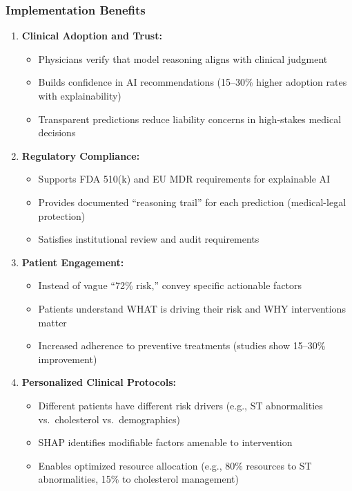 \documentclass[12pt,a4paper]{article}
\begin{document}
\subsubsection{Implementation Benefits}

\begin{enumerate}
    \item \textbf{Clinical Adoption and Trust:}
    \begin{itemize}
        \item Physicians verify that model reasoning aligns with clinical judgment
        \item Builds confidence in AI recommendations (15--30\% higher adoption rates with explainability)
        \item Transparent predictions reduce liability concerns in high-stakes medical decisions
    \end{itemize}
    
    \item \textbf{Regulatory Compliance:}
    \begin{itemize}
        \item Supports FDA 510(k) and EU MDR requirements for explainable AI
        \item Provides documented ``reasoning trail'' for each prediction (medical-legal protection)
        \item Satisfies institutional review and audit requirements
    \end{itemize}
    
    \item \textbf{Patient Engagement:}
    \begin{itemize}
        \item Instead of vague ``72\% risk,'' convey specific actionable factors
        \item Patients understand WHAT is driving their risk and WHY interventions matter
        \item Increased adherence to preventive treatments (studies show 15--30\% improvement)
    \end{itemize}
    
    \item \textbf{Personalized Clinical Protocols:}
    \begin{itemize}
        \item Different patients have different risk drivers (e.g., ST abnormalities vs.\ cholesterol vs.\ demographics)
        \item SHAP identifies modifiable factors amenable to intervention
        \item Enables optimized resource allocation (e.g., 80\% resources to ST abnormalities, 15\% to cholesterol management)
    \end{itemize}
    

\end{enumerate}
\end{document}
